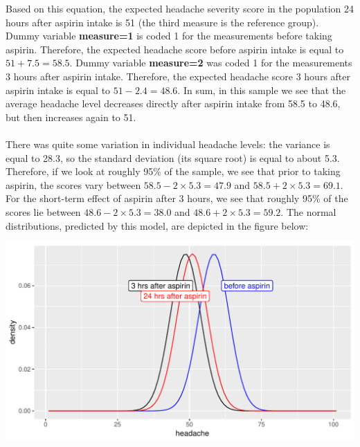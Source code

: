 \documentclass[]{report}\usepackage[]{graphicx}\usepackage[]{color}
\makeatletter
\def\maxwidth{ %
  \ifdim\Gin@nat@width>\linewidth
    \linewidth
  \else
    \Gin@nat@width
  \fi
}
\newenvironment{knitrout}{}{} %
\makeatother
\begin{document}
Based on this equation, the expected headache severity score in the population 24 hours after aspirin intake is 51 (the third measure is the reference group). Dummy variable \textbf{measure=1} is coded 1 for the measurements before taking aspirin. Therefore, the expected headache score before aspirin intake is equal to $51+7.5 = 58.5$. Dummy variable \textbf{measure=2} was coded 1 for the measurements 3 hours after aspirin intake. Therefore, the expected headache score 3 hours after aspirin intake is equal to $51 - 2.4 = 48.6$. In sum, in this sample we see that the average headache level decreases directly after aspirin intake from 58.5 to 48.6, but then increases again to 51. 
\\
\\
There was quite some variation in individual headache levels: the variance is equal to 28.3, so the standard deviation (its square root) is equal to about 5.3. Therefore, if we look at roughly 95\% of the sample, we see that prior to taking aspirin, the scores vary between $58.5 -2\times 5.3 = 47.9$ and $58.5 + 2 \times 5.3 = 69.1$. For the short-term effect of aspirin after 3 hours, we see that roughly 95\% of the scores lie between $48.6 -2\times 5.3 = 38.0$ and $48.6 + 2 \times 5.3 = 59.2$. The normal distributions, predicted by this model, are depicted in the figure below:


\begin{knitrout}
\color{fgcolor}

{\centering \includegraphics[width=\maxwidth]{figure/analysispremidpost3-1} 

}



\end{knitrout}
\end{document}

